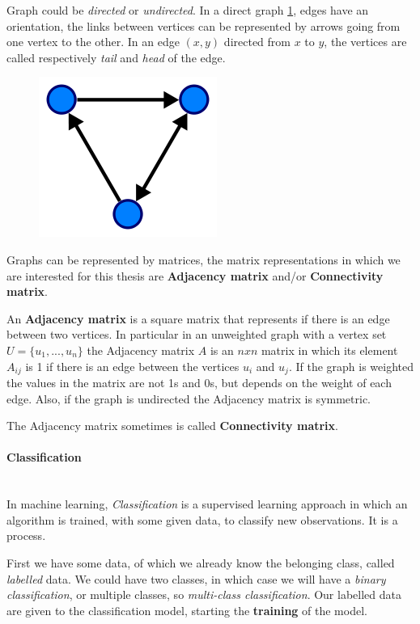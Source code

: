 Graph could be \textit{directed} or \textit{undirected}. In a direct graph \ref{fig:diagram2}, edges have an orientation, the links between vertices can be represented by arrows going from one vertex to the other. In an edge $ (x,y) $ directed from $ x $ to $ y $, the vertices are called respectively \textit{tail} and \textit{head} of the edge.
\begin{figure}[htbp]
	\centering
	\includegraphics[scale=0.5]{Immagini/220px-Directed.svg.png}
	\caption{\label{fig:diagram2}}
\end{figure}

Graphs can be represented by matrices, the matrix representations in which we are interested for this thesis are \textbf{Adjacency matrix} and/or \textbf{Connectivity matrix}. 

An \textbf{Adjacency matrix} is a square matrix that represents if there is an edge between two vertices. In particular in an unweighted graph with a vertex set $ U=\{u_{1}, ..., u_{n}\} $ the Adjacency matrix $ A $ is an $ n x n $ matrix in which its element $ A_{ij} $ is 1 if there is an edge between the vertices $ u_{i} $ and $ u_{j} $. If the graph is weighted the values in the matrix are not 1s and 0s, but depends on the weight of each edge. Also, if the graph is undirected the Adjacency matrix is symmetric.

The Adjacency matrix sometimes is called \textbf{Connectivity matrix}.

\paragraph{Classification}\
\\
In machine learning, \emph{Classification} is a supervised learning approach in which an algorithm is trained, with some given data, to classify new observations. It is a process. 

First we have some data, of which we already know the belonging class, called \emph{labelled} data. We could have two classes, in which case we will have a \emph{binary classification}, or multiple classes, so \emph{multi-class classification}. Our labelled data are given to the classification model, starting the \textbf{training} of the model.

